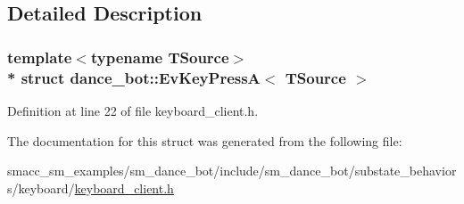 \subsection{Detailed Description}
\subsubsection*{template$<$typename T\+Source$>$\\*
struct dance\+\_\+bot\+::\+Ev\+Key\+Press\+A$<$ T\+Source $>$}



Definition at line 22 of file keyboard\+\_\+client.\+h.



The documentation for this struct was generated from the following file\+:\begin{DoxyCompactItemize}
\item 
smacc\+\_\+sm\+\_\+examples/sm\+\_\+dance\+\_\+bot/include/sm\+\_\+dance\+\_\+bot/substate\+\_\+behaviors/keyboard/\hyperlink{keyboard__client_8h}{keyboard\+\_\+client.\+h}\end{DoxyCompactItemize}
